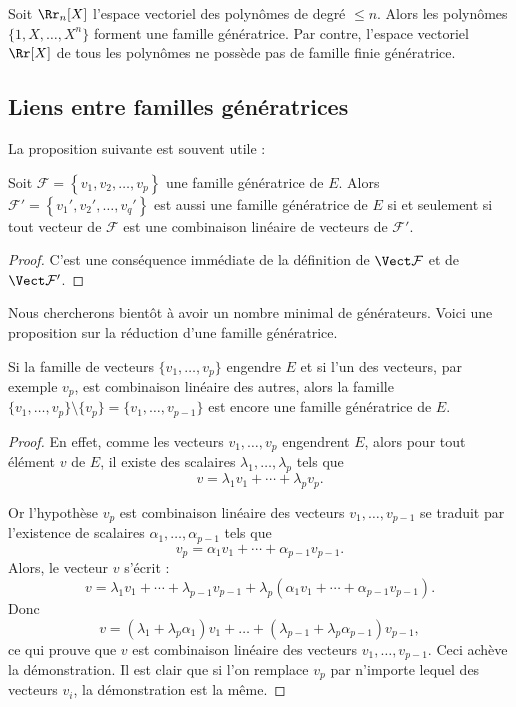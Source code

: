 \documentclass[class=report,crop=false]{standalone}
\begin{document}
\begin{exemple}
Soit $\Rr_n[X]$ l'espace vectoriel des polynômes de degré $\le n$.
Alors les polyn\^omes $\{1, X, \dots , X^n\}$ forment une famille génératrice.
Par contre, l'espace vectoriel $\Rr[X]$ de tous les polynômes
ne possède pas de famille finie génératrice.
\end{exemple}

\subsection{Liens entre familles génératrices}

La proposition suivante est souvent utile :

\begin{proposition}
Soit $\mathcal{F} = \left\{ v_1, v_2, \dots , v_p\right\}$ une famille génératrice de $E$.
Alors $\mathcal{F}' = \left\{ v_1', v_2', \dots , v_q'\right\}$ est aussi une famille
génératrice de $E$ si et seulement si tout vecteur de $\mathcal{F}$
est une combinaison linéaire de vecteurs de $\mathcal{F}'$.
\end{proposition}

\begin{proof}
C'est une conséquence immédiate de la définition
de $\Vect \mathcal{F}$ et de $\Vect \mathcal{F}'$.
\end{proof}

\bigskip

Nous chercherons bientôt à avoir un nombre minimal de générateurs.
Voici une proposition sur la réduction d'une famille génératrice.
\begin{proposition}
Si la famille de vecteurs  $\{v_1,\ldots,v_p\}$ engendre $E$ et si l'un des vecteurs,
par exemple $v_p$, est combinaison linéaire des autres, alors la famille
$\{v_1,\dots ,v_p\} \setminus \{v_p\}= \{v_1,\dots ,v_{p-1}\}$
est encore une famille génératrice de $E$.
\end{proposition}

\begin{proof}
En effet, comme les vecteurs  $v_1,\dots ,v_p$ engendrent $E$,
alors pour tout élément $v$ de $E$, il existe des scalaires
$\lambda_1,\ldots ,\lambda_p$ tels que
$$v=\lambda_1 v_1+ \cdots + \lambda_p v_p.$$

Or l'hypothèse $v_p$ est combinaison linéaire des vecteurs
$v_1,\dots ,v_{p-1}$ se traduit par l'existence de scalaires
$\alpha_1, \ldots, \alpha_{p-1}$ tels que
$$v_p = \alpha_1 v_1 + \cdots + \alpha_{p-1}v_{p-1}.$$
Alors, le vecteur $v$ s'écrit :
$$v = \lambda_1 v_1+ \cdots + \lambda_{p-1}v_{p-1} + \lambda_{p}
\left( \alpha_1 v_1+\cdots+\alpha_{p-1}v_{p-1} \right).$$
Donc
 $$v=\left ( \lambda_1+\lambda_{p}\alpha_1\right )v_1+\dots +
 \left ( \lambda_{p-1}+\lambda_{p}\alpha_{p-1}\right )v_{p-1},$$
ce qui prouve que $v$ est combinaison linéaire des vecteurs
$v_1, \ldots ,v_{p-1}$. Ceci achève la démonstration.
Il est clair que si l'on remplace $v_p$ par n'importe lequel des
vecteurs $v_i$, la démonstration est la même.
\end{proof}
\end{document}
